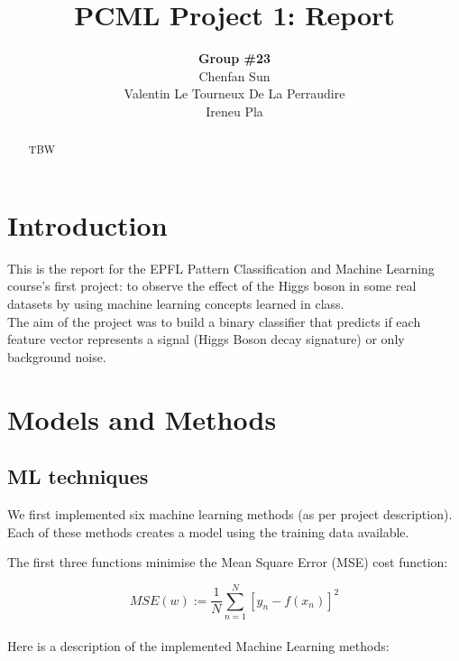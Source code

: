 \documentclass[10pt,conference,compsocconf]{IEEEtran}
\begin{document}
\title{PCML Project 1: Report}

\author{
  \textbf{Group \#23} \\
  Chenfan Sun \\
  Valentin Le Tourneux De La Perraudire \\
  Ireneu Pla
}

\maketitle

\begin{abstract}
TBW
\end{abstract}


\section{Introduction}

This is the report for the EPFL Pattern Classification and Machine Learning course's first project: to observe the effect of the Higgs boson in some real datasets by using machine learning concepts learned in class. \\
The aim of the project was to build a binary classifier that predicts if each feature vector represents a signal (Higgs Boson decay signature) or only background noise.

\section{Models and Methods}

\subsection{ML techniques}

We first implemented six machine learning methods (as per project description). Each of these methods creates a model using the training data available.

The first three functions minimise the Mean Square Error (MSE) cost function:

$$MSE(w) := \frac{1}{N}\sum\limits_{n=1}^N {[y_n - f(x_n)]}^2$$ \\

Here is a description of the implemented Machine Learning methods:
\end{document}
